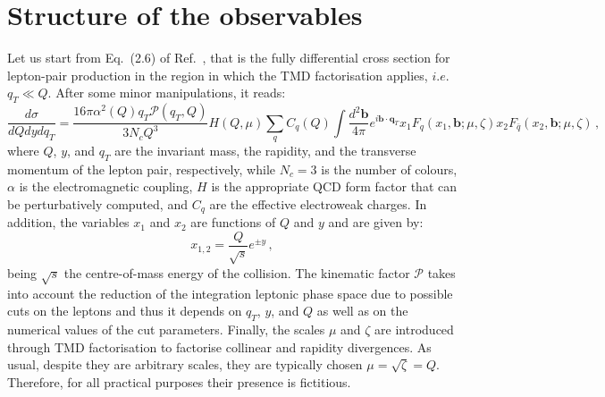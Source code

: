 \documentclass[10pt,a4paper]{article}
\begin{document}
\section{Structure of the observables}

Let us start from Eq.~(2.6) of Ref.~\cite{Scimemi:2017etj}, that is
the fully differential cross section for lepton-pair production in the
region in which the TMD factorisation applies, $i.e.$ $q_T \ll
Q$. After some minor manipulations, it reads:
\begin{equation}\label{eq:crosssection}
\frac{d\sigma}{dQ dy dq_T} =
\frac{16\pi\alpha^2(Q)q_T\mathcal{P}(q_T,Q)}{3N_c Q^3} H(Q,\mu) \sum_q C_q(Q)
\int\frac{d^2\mathbf{b}}{4\pi} e^{i \mathbf{b}\cdot \mathbf{q}_T} x_1F_q(x_1,\mathbf{b};\mu,\zeta) x_2F_{\bar{q}}(x_2,\mathbf{b};\mu,\zeta)\,,
\end{equation}
where $Q$, $y$, and $q_T$ are the invariant mass, the rapidity, and
the transverse momentum of the lepton pair, respectively, while
$N_c=3$ is the number of colours, $\alpha$ is the electromagnetic
coupling, $H$ is the appropriate QCD form factor that can be
perturbatively computed, and $C_q$ are the effective electroweak
charges. In addition, the variables $x_1$ and $x_2$ are functions of
$Q$ and $y$ and are given by:
\begin{equation}\label{eq:Bjorkenx12}
  x_{1,2} = \frac{Q}{\sqrt{s}}e^{\pm y}\,,
\end{equation}
being $\sqrt{s}$ the centre-of-mass energy of the collision. The
kinematic factor $\mathcal{P}$ takes into account the reduction of the
integration leptonic phase space due to possible cuts on the leptons
and thus it depends on $q_T$, $y$, and $Q$ as well as on the numerical
values of the cut parameters. Finally, the scales $\mu$ and $\zeta$
are introduced through TMD factorisation to factorise collinear and
rapidity divergences. As usual, despite they are arbitrary scales,
they are typically chosen $\mu=\sqrt{\zeta}=Q$. Therefore, for all
practical purposes their presence is fictitious.
\end{document}
